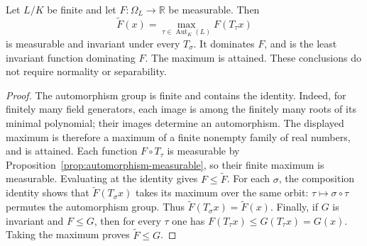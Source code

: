 \begin{lemma}
\label{lem:measurable-orbit-maximum}
\leanok
Let $L/K$ be finite and let $F:\Omega_L\to\mathbb R$ be measurable.
Then
\[
 \widetilde F(x)=\max_{\tau\in\operatorname{Aut}_K(L)} F(T_\tau x)
\]
is measurable and invariant under every $T_\sigma$. It dominates $F$,
and is the least invariant function dominating $F$. The maximum is
attained. These conclusions do not require normality or separability.
\end{lemma}
\begin{proof}
The automorphism group is finite and contains the identity. Indeed, for
finitely many field generators, each image is among the finitely many
roots of its minimal polynomial; their images determine an automorphism.
The displayed maximum is therefore a maximum of a finite nonempty family
of real numbers, and is attained. Each function $F\circ T_\tau$ is
measurable by Proposition~\ref{prop:automorphism-measurable}, so their
finite maximum is measurable. Evaluating at the identity gives
$F\leq\widetilde F$.
For each $\sigma$, the composition identity shows that
$\widetilde F(T_\sigma x)$ takes its maximum over the same orbit:
$\tau\mapsto\sigma\circ\tau$ permutes the automorphism group.
Thus $\widetilde F(T_\sigma x)=\widetilde F(x)$. Finally, if $G$ is
invariant and $F\leq G$, then for every $\tau$ one has
$F(T_\tau x)\leq G(T_\tau x)=G(x)$. Taking the maximum proves
$\widetilde F\leq G$.
\end{proof}

